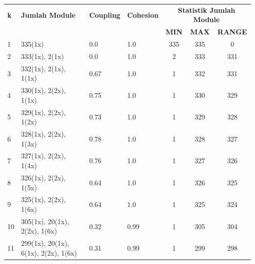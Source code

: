 \begingroup
\setlength{\LTleft}{-20cm plus -1fill}
\setlength{\LTright}{\LTleft}
\begin{small}
\begin{longtable}{|p{0.5cm}|p{9cm}|p{1.3cm}|p{1.3cm}|c|c|c|}
	\hline
	\textbf{k} & \textbf{Jumlah Module} & \textbf{Coupling} & \textbf{Cohesion} & \multicolumn{3}{c|}{\textbf{Statistik Jumlah Module}} \\
	\cline{5-7}
	&  &  &  & \textbf{MIN} & \textbf{MAX} & \textbf{RANGE} \\
	\hline
	\endfirsthead
	\hline 
  1 & 335(1x) & \cellcolor{colorGood}  0.0 & \cellcolor{colorGood} 1.0 & 335 & 335 & \cellcolor{colorGood} 0 \\   \hline
  2 & 333(1x), 2(1x) & \cellcolor{colorGood}  0.0 & \cellcolor{colorGood} 1.0 & 2 & 333 & \cellcolor{colorBad} 331 \\   \hline
  3 & 332(1x), 2(1x), 1(1x) & \cellcolor{colorGood}  0.67 & \cellcolor{colorGood} 1.0 & 1 & 332 & \cellcolor{colorBad} 331 \\   \hline
  4 & 330(1x), 2(2x), 1(1x) & \cellcolor{colorGood}  0.75 & \cellcolor{colorGood} 1.0 & 1 & 330 & \cellcolor{colorBad} 329 \\   \hline
  5 & 329(1x), 2(2x), 1(2x) & \cellcolor{colorGood}  0.73 & \cellcolor{colorGood} 1.0 & 1 & 329 & \cellcolor{colorBad} 328 \\   \hline
  6 & 328(1x), 2(2x), 1(3x) & \cellcolor{colorGood}  0.78 & \cellcolor{colorGood} 1.0 & 1 & 328 & \cellcolor{colorBad} 327 \\   \hline
  7 & 327(1x), 2(2x), 1(4x) & \cellcolor{colorGood}  0.76 & \cellcolor{colorGood} 1.0 & 1 & 327 & \cellcolor{colorBad} 326 \\   \hline
  8 & 326(1x), 2(2x), 1(5x) & \cellcolor{colorGood}  0.64 & \cellcolor{colorGood} 1.0 & 1 & 326 & \cellcolor{colorBad} 325 \\   \hline
  9 & 325(1x), 2(2x), 1(6x) & \cellcolor{colorGood}  0.64 & \cellcolor{colorGood} 1.0 & 1 & 325 & \cellcolor{colorBad} 324 \\   \hline
  10 & 305(1x), 20(1x), 2(2x), 1(6x) & \cellcolor{colorGood}  0.32 & \cellcolor{colorGood} 0.99 & 1 & 305 & \cellcolor{colorBad} 304 \\   \hline
  11 & 299(1x), 20(1x), 6(1x), 2(2x), 1(6x) & \cellcolor{colorGood}  0.31 & \cellcolor{colorGood} 0.99 & 1 & 299 & \cellcolor{colorBad} 298 \\   \hline

\end{longtable}
\end{small}
